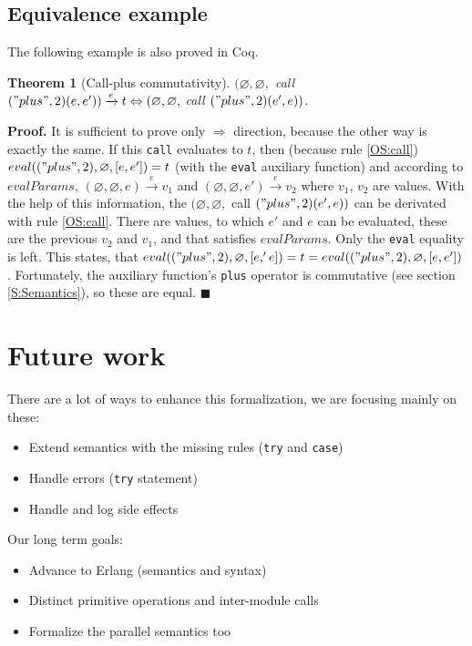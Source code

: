 \documentclass[12pt]{article}
\newtheorem{thm}{Theorem}[section]
\theoremstyle{definition}
\newcommand{\ose}{\xrightarrow{e}}
\numberwithin{equation}{section}
\begin{document}
\subsection{Equivalence example}

The following example is also proved in Coq.

\begin{thm}[Call-plus commutativity]
	$(\varnothing, \varnothing, $ call $ ("plus", 2)(e, e')) \ose t \Leftrightarrow (\varnothing, \varnothing, $ call $ ("plus", 2)(e', e))$.
\end{thm}
\noindent
{\bf Proof.} It is sufficient to prove only $\Rightarrow$ direction, because the other way is exactly the same. If this \verb|call| evaluates to $t$, then (because rule \ref{OS:call}) $eval(("plus", 2), \varnothing, [e, e']) = t$ (with the \verb|eval| auxiliary function) and according to $evalParams$, $(\varnothing, \varnothing, e) \ose v_1$ and $(\varnothing, \varnothing, e') \ose v_2$ where $v_1$, $v_2$ are values. With the help of this information, the $(\varnothing, \varnothing, $ call $ ("plus", 2)(e', e))$ can be derivated with rule \ref{OS:call}. There are values, to which $e'$ and $e$ can be evaluated, these are the previous $v_2$ and $v_1$, and that satisfies $evalParams$. Only the \verb|eval| equality is left. This states, that $eval(("plus", 2), \varnothing, [e,' e]) = t = eval(("plus", 2), \varnothing, [e, e'])$. Fortunately, the auxiliary function's \verb|plus| operator is commutative (see section \ref{S:Semantics}), so these are equal. $\blacksquare$


\section{Future work}

There are a lot of ways to enhance this formalization, we are focusing mainly on these:
\begin{itemize}
	\item Extend semantics with the missing rules (\verb|try| and \verb|case|)
	\item Handle errors (\verb|try| statement)
	\item Handle and log side effects
\end{itemize}

\noindent Our long term goals:
\begin{itemize}
	\item Advance to Erlang (semantics and syntax)
	\item Distinct primitive operations and inter-module calls
	\item Formalize the parallel semantics too
\end{itemize}
\end{document}
